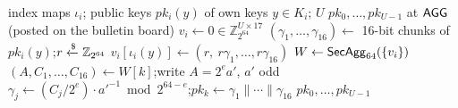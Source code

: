 \begin{algorithm}[t]
\caption{$\mathsf{PkAgg}$: $\Agg$ learns every $pk$ but not its holders}
\label{alg:pkagg}
\begin{algorithmic}[1]
\Require index maps $\iota_i$; public keys $pk_i(y)$ of own keys $y\in K_i$; $U$
\Ensure $pk_0,\dots,pk_{U-1}$ at $\Agg$ (posted on the bulletin board)
\Repeat
    \State $v_i\gets 0\in\mathbb{Z}_{2^{64}}^{U\times 17}$
      \State $(\gamma_1,\dots,\gamma_{16})\gets$ 16-bit chunks of $pk_i(y)$;\quad $r\xleftarrow{\$}\mathbb{Z}_{2^{64}}$
      \State $v_i[\iota_i(y)]\gets(r,\ r\gamma_1,\dots,r\gamma_{16})$ 
    \EndFor
  \EndFor
  \State $W\gets\mathsf{SecAgg}_{64}(\{v_i\})$
   \Comment{$\Agg$}
    \State $(A,C_1,\dots,C_{16})\gets W[k]$;\quad write $A=2^{e}a'$, $a'$ odd
    \State $\gamma_j\gets (C_j/2^{e})\cdot a'^{-1}\bmod 2^{64-e}$;\quad $pk_k\gets\gamma_1\|\cdots\|\gamma_{16}$
  \EndFor
{} 
\State \Return $pk_0,\dots,pk_{U-1}$
\end{algorithmic}
\end{algorithm}

